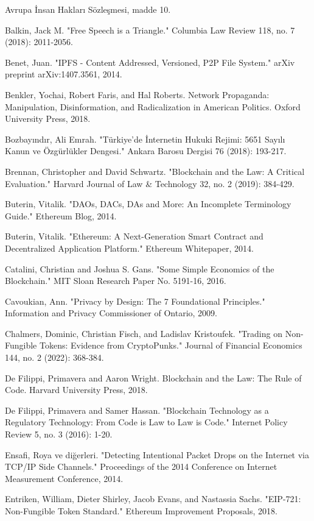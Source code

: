 \documentclass[11pt,a4paper]{article}
\begin{document}
Avrupa İnsan Hakları Sözleşmesi, madde 10.

Balkin, Jack M. "Free Speech is a Triangle." Columbia Law Review 118, no. 7 (2018): 2011-2056.

Benet, Juan. "IPFS - Content Addressed, Versioned, P2P File System." arXiv preprint arXiv:1407.3561, 2014.

Benkler, Yochai, Robert Faris, and Hal Roberts. Network Propaganda: Manipulation, Disinformation, and Radicalization in American Politics. Oxford University Press, 2018.

Bozbayındır, Ali Emrah. "Türkiye'de İnternetin Hukuki Rejimi: 5651 Sayılı Kanun ve Özgürlükler Dengesi." Ankara Barosu Dergisi 76 (2018): 193-217.

Brennan, Christopher and David Schwartz. "Blockchain and the Law: A Critical Evaluation." Harvard Journal of Law & Technology 32, no. 2 (2019): 384-429.

Buterin, Vitalik. "DAOs, DACs, DAs and More: An Incomplete Terminology Guide." Ethereum Blog, 2014.

Buterin, Vitalik. "Ethereum: A Next-Generation Smart Contract and Decentralized Application Platform." Ethereum Whitepaper, 2014.

Catalini, Christian and Joshua S. Gans. "Some Simple Economics of the Blockchain." MIT Sloan Research Paper No. 5191-16, 2016.

Cavoukian, Ann. "Privacy by Design: The 7 Foundational Principles." Information and Privacy Commissioner of Ontario, 2009.

Chalmers, Dominic, Christian Fisch, and Ladislav Kristoufek. "Trading on Non-Fungible Tokens: Evidence from CryptoPunks." Journal of Financial Economics 144, no. 2 (2022): 368-384.

De Filippi, Primavera and Aaron Wright. Blockchain and the Law: The Rule of Code. Harvard University Press, 2018.

De Filippi, Primavera and Samer Hassan. "Blockchain Technology as a Regulatory Technology: From Code is Law to Law is Code." Internet Policy Review 5, no. 3 (2016): 1-20.

Ensafi, Roya ve diğerleri. "Detecting Intentional Packet Drops on the Internet via TCP/IP Side Channels." Proceedings of the 2014 Conference on Internet Measurement Conference, 2014.

Entriken, William, Dieter Shirley, Jacob Evans, and Nastassia Sachs. "EIP-721: Non-Fungible Token Standard." Ethereum Improvement Proposals, 2018.
\end{document}
